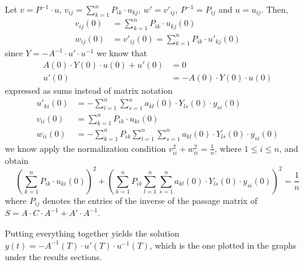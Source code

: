 Let $v = P^{-1} \cdot u$, $v_{ij} = \sum_{k=1}^n P_{ik} \cdot u_{kj}$, $w' = v'_{ij}$, $P^{-1} = P_{ij}$ and $u = u_{ij}$. Then,
\begin{equation*}
    \begin{split}
        v_{ij}(0) &= \sum_{k=1}^n P_{ik} \cdot u_{kj}(0)
        \\
        w_{ij}(0) &= v'_{ij}(0) = \sum_{k=1}^n P_{ik} \cdot u'_{kj}(0)
    \end{split}
\end{equation*}
since $Y = -A^{-1} \cdot u' \cdot u^{-1}$ we know that 
\begin{equation*}
    \begin{split}
        A(0) \cdot Y(0) \cdot u(0) + u'(0) &= 0\\
        u'(0) &= -A(0) \cdot Y(0) \cdot u(0)
    \end{split}
\end{equation*}
expressed as sums instead of matrix notation
\begin{equation*}
    \begin{split}
        u'_{ki}(0) &= - \sum_{l=1}^n \sum_{s=1}^n a_{kl}(0) \cdot Y_{ls}(0) \cdot y_{si}(0)
        \\
        v_{ii}(0) &= \sum_{k=1}^n P_{ik} \cdot u_{ki}(0)
        \\
        w_{ii}(0) &= - \sum_{k=1}^n P_{ik} \sum_{l=1}^n \sum_{s=1}^n a_{kl}(0) \cdot Y_{ls}(0) \cdot y_{si}(0)
    \end{split}
\end{equation*}
we know apply the normalization condition $v_{ii}^2 + w_{ii}^2 = \frac{1}{n}$, where $1 \leq i \leq n$, and obtain
\begin{equation*}
    (\sum_{k=1}^n P_{ik} \cdot u_{ki}(0))^2 + (\sum_{k=1}^n P_{ik} \sum_{l=1}^n \sum_{s=1}^n a_{kl}(0) \cdot Y_{ls}(0) \cdot y_{si}(0))^2 = \frac{1}{n}
\end{equation*}
where $P_{ij}$ denotes the entries of the inverse of the passage matrix of $S = A \cdot C \cdot A^{-1} + A' \cdot A^{-1}$.

Putting everything together yields the solution $y(t) = -A^{-1}(T) \cdot u'(T) \cdot u^{-1}(T)$, which is the one plotted in the graphs under the results sections.